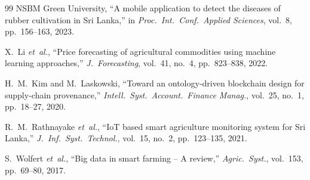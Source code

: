 \documentclass[10pt, conference]{IEEEtran}
\begin{document}
\begin{thebibliography}{99}
NSBM Green University, ``A mobile application to detect the diseases of
rubber cultivation in Sri Lanka,'' in \textit{Proc.\ Int.\ Conf.\
Applied Sciences}, vol.~8, pp.~156--163, 2023.

X.~Li \textit{et~al.}, ``Price forecasting of agricultural commodities
using machine learning approaches,'' \textit{J.\ Forecasting}, vol.~41,
no.~4, pp.~823--838, 2022.

H.~M.~Kim and M.~Laskowski, ``Toward an ontology-driven blockchain
design for supply-chain provenance,'' \textit{Intell.\ Syst.\ Account.\
Finance Manag.}, vol.~25, no.~1, pp.~18--27, 2020.

R.~M.~Rathnayake \textit{et~al.}, ``IoT based smart agriculture
monitoring system for Sri Lanka,'' \textit{J.\ Inf.\ Syst.\ Technol.},
vol.~15, no.~2, pp.~123--135, 2021.

S.~Wolfert \textit{et~al.}, ``Big data in smart farming -- A review,''
\textit{Agric.\ Syst.}, vol.~153, pp.~69--80, 2017.

\end{thebibliography}
\end{document}
